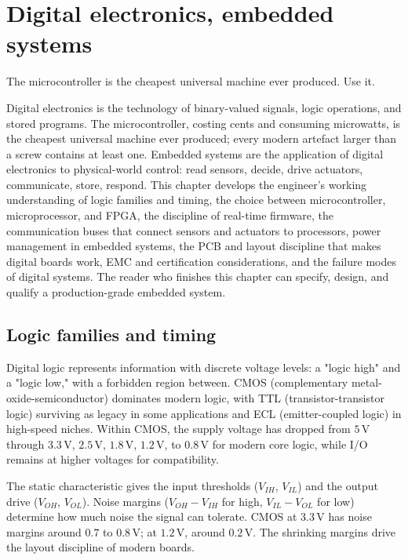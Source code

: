 \chapter{Digital electronics, embedded systems}
\label{vol08:ch10}

\epigraph{The microcontroller is the cheapest universal machine ever produced. Use it.}{}


\noindent
Digital electronics is the technology of binary-valued signals, logic operations, and stored programs. The microcontroller, costing cents and consuming microwatts, is the cheapest universal machine ever produced; every modern artefact larger than a screw contains at least one. Embedded systems are the application of digital electronics to physical-world control: read sensors, decide, drive actuators, communicate, store, respond. This chapter develops the engineer's working understanding of logic families and timing, the choice between microcontroller, microprocessor, and FPGA, the discipline of real-time firmware, the communication buses that connect sensors and actuators to processors, power management in embedded systems, the PCB and layout discipline that makes digital boards work, EMC and certification considerations, and the failure modes of digital systems. The reader who finishes this chapter can specify, design, and qualify a production-grade embedded system.

\section{Logic families and timing}

Digital logic represents information with discrete voltage levels: a "logic high" and a "logic low," with a forbidden region between. CMOS (complementary metal-oxide-semiconductor) dominates modern logic, with TTL (transistor-transistor logic) surviving as legacy in some applications and ECL (emitter-coupled logic) in high-speed niches. Within CMOS, the supply voltage has dropped from $5\,\text{V}$ through $3.3\,\text{V}$, $2.5\,\text{V}$, $1.8\,\text{V}$, $1.2\,\text{V}$, to $0.8\,\text{V}$ for modern core logic, while I/O remains at higher voltages for compatibility.

The static characteristic gives the input thresholds ($V_{IH}$, $V_{IL}$) and the output drive ($V_{OH}$, $V_{OL}$). Noise margins ($V_{OH} - V_{IH}$ for high, $V_{IL} - V_{OL}$ for low) determine how much noise the signal can tolerate. CMOS at $3.3\,\text{V}$ has noise margins around $0.7$ to $0.8\,\text{V}$; at $1.2\,\text{V}$, around $0.2\,\text{V}$. The shrinking margins drive the layout discipline of modern boards.

